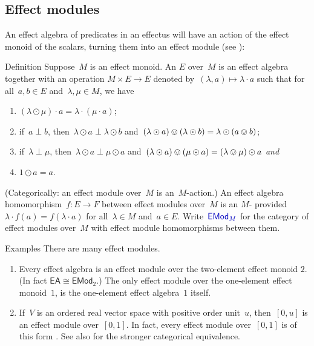 \documentclass[b]{subfiles}
\begin{document}
\subsection{Effect modules}
\begin{parsec}%
\begin{point}%
An effect algebra of predicates in an effectus
    will have an action of the effect monoid of the scalars,
    turning them into an effect module (see ):
\end{point}
\begin{point}{Definition}%
Suppose~$M$ is an effect monoid.
An  $E$ over~$M$ \cite{corefl}
    is an effect algebra together with an operation
            $M \times E \to E$
            denoted by~$(\lambda, a) \mapsto \lambda \cdot a$
    such that for all~$a,b \in E$ and~$\lambda,\mu \in M$, we have
\begin{enumerate}
\item
    $(\lambda \odot \mu) \cdot a = \lambda \cdot (\mu \cdot a)$;
\item
    if~$a \perp b$,
     then~$\lambda \odot a \perp \lambda \odot b$
     and~$(\lambda \odot a) \ovee (\lambda\odot b) = \lambda \odot(a \ovee b)$;
\item
    if~$\lambda \perp \mu$,
     then~$\lambda \odot a \perp \mu \odot a$
     and~$(\lambda \odot a) \ovee (\mu \odot a) = (\lambda \ovee \mu) \odot a$
            \emph{and}
\item
    $1 \odot a = a$.
\end{enumerate}
(Categorically: an effect module over~$M$
    is an~$M$-action.)
An effect algebra homomorphism~$f\colon E \to F$
    between effect modules over~$M$
    is an $M$-
    provided~$\lambda \cdot f(a) = f(\lambda \cdot a)$
    for all~$\lambda \in M$ and~$a \in E$.
Write~$\Define{\mathsf{EMod}_M}$
    for the category of effect modules over~$M$
    with effect module homomorphisms between them.
\end{point}
\begin{point}{Examples}%
There are many effect modules.
\begin{enumerate}
\item
Every effect algebra is an effect module over
    the two-element effect monoid $2$.
    (In fact $\mathsf{EA} \cong \mathsf{EMod}_{2}$.)
The only effect module over the one-element effect monoid~$1$,
    is the one-element effect algebra~$1$ itself.
\item
If~$V$ is an ordered real vector space with positive order unit~$u$,
    then~$[0,u]$ is an effect module over~$[0,1]$.
In fact, every effect module over~$[0,1]$
    is of this form \cite{gudder1998representation}.
See also \cite[Thm.~3]{jacobs2016expectation}
    for the stronger categorical equivalence.
\end{enumerate}
\end{point}
\end{parsec}
\end{document}
